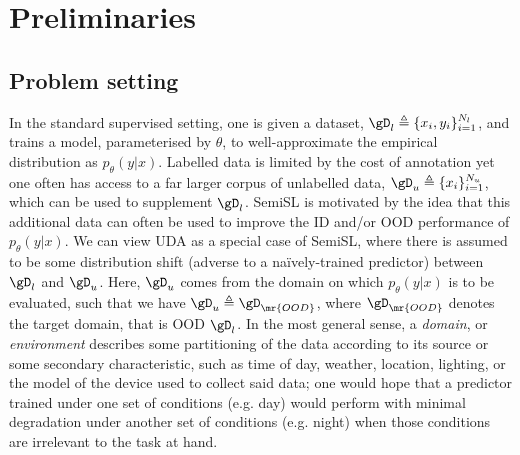 \section{Preliminaries}\label{sec:prelims}
\subsection{Problem setting}
%
In the standard supervised setting, one is given a dataset, \( \gD_l \triangleq \{x_i,
y_i\}_{i=1}^{N_l} \), and trains a model, parameterised by \(\theta\), to well-approximate the
empirical distribution as \( p_\theta(y | x) \).
%
Labelled data is limited by the cost of annotation yet one often has access to a far larger corpus
of unlabelled data, \( \gD_u \triangleq \{x_i\}_{i=1}^{N_u} \), which can be used to supplement
\(\gD_l\). 
%
\Acf{SemiSL} is motivated by the idea that this additional data can often be used to improve the
\ac{ID} and/or \ac{OOD} performance of \(p_\theta(y | x)\).
%
We can view \acf{UDA} as a special case of \ac{SemiSL}, where there is assumed to be some
distribution shift (adverse to a na\"ively-trained predictor) between \( \gD_l \) and \( \gD_u \).
%
Here, \( \gD_u \) comes from the domain on which \(p_\theta(y | x)\) is to be evaluated, such that
we have \( \gD_u \triangleq \gD_\mr{OOD} \), where \( \gD_\mr{OOD} \) denotes the target domain,
that is \ac{OOD} \wrt{} \( \gD_l \).
%
In the most general sense, a \emph{domain}, or \emph{environment} \citep{arjovsky2019invariant,
creager2021environment} describes some partitioning of the data according to its source or some
secondary characteristic, such as time of day, weather, location, lighting, or the model of the
device used to collect said data; one would hope that a predictor trained under one set of
conditions (e.g. day) would perform with minimal degradation under another set of conditions (e.g.
night) when those conditions are irrelevant to the task at hand.
%

